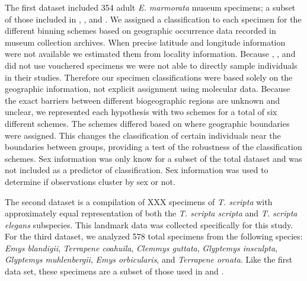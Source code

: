 \documentclass[12pt,letterpaper]{article}
\begin{document}
The first dataset included 354 adult \textit{E. marmorata} museum specimens; a subset of those included in \citet{Angielczyk2007}, \citet{Angielczyk2011}, and \citet{Angielczyk2013a}. We assigned a classification to each specimen for the different binning schemes based on geographic occurrence data recorded in museum collection archives. When precise latitude and longitude information were not available we estimated them from locality information. Because \citet{Spinks2005}, \citet{Spinks2010}, and \citet{Spinks2014} did not use vouchered specimens we were not able to directly sample individuals in their studies. Therefore our specimen classifications were based solely on the geographic information, not explicit assignment using molecular data. Because the exact barriers between different biogeographic regions are unknown and unclear, we represented each hypothesis with two schemes for a total of six different schemes. The schemes differed based on where geographic boundaries were assigned. This changes the classification of certain individuals near the boundaries between groups, providing a test of the robustness of the classification schemes. Sex information was only know for a subset of the total dataset and was not included as a predictor of classification. Sex information was used to determine if observations cluster by sex or not.

The second dataset is a compilation of XXX specimens of \textit{T. scripta} with approximately equal representation of both the \textit{T. scripta scripta} and \textit{T. scripta elegans} subspecies. This landmark data was collected specifically for this study. For the third dataset, we analyzed 578 total specimens from the following species: \textit{Emys blandigii}, \textit{Terrapene coahuila}, \textit{Clemmys guttata}, \textit{Glyptemys insculpta}, \textit{Glyptemys muhlenbergii}, \textit{Emys orbicularis}, and \textit{Terrapene ornata}. Like the first data set, these specimens are a subset of those used in \citet{Angielczyk2011} and \citet{Angielczyk2013a}.
\end{document}
